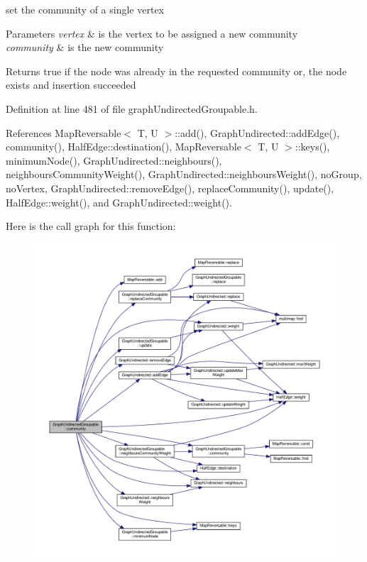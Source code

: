 set the community of a single vertex 
\begin{DoxyParams}{Parameters}
{\em vertex} & is the vertex to be assigned a new community \\
\hline
{\em community} & is the new community \\
\hline
\end{DoxyParams}
\begin{DoxyReturn}{Returns}
true if the node was already in the requested community or, the node exists and insertion succeeded 
\end{DoxyReturn}


Definition at line 481 of file graph\+Undirected\+Groupable.\+h.



References Map\+Reversable$<$ T, U $>$\+::add(), Graph\+Undirected\+::add\+Edge(), community(), Half\+Edge\+::destination(), Map\+Reversable$<$ T, U $>$\+::keys(), minimum\+Node(), Graph\+Undirected\+::neighbours(), neighbours\+Community\+Weight(), Graph\+Undirected\+::neighbours\+Weight(), no\+Group, no\+Vertex, Graph\+Undirected\+::remove\+Edge(), replace\+Community(), update(), Half\+Edge\+::weight(), and Graph\+Undirected\+::weight().

Here is the call graph for this function\+:
\nopagebreak
\begin{figure}[H]
\begin{center}
\leavevmode
\includegraphics[width=350pt]{classGraphUndirectedGroupable_a7a9642a50ac522d9020afb9df211702f_cgraph}
\end{center}
\end{figure}
\mbox{\label{classGraphUndirectedGroupable_adf6ebb83c3df6317f122a13650309ac4}} 
